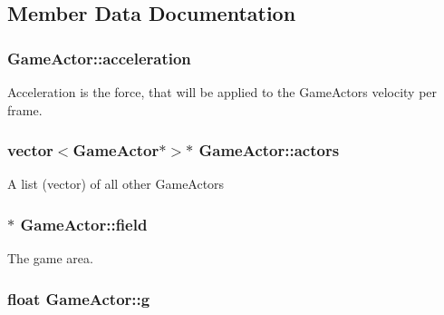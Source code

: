 \subsection{Member Data Documentation}
\hypertarget{class_game_actor_aa62fdbdad09045bcd6f3a150c3a0038b}{
\subsubsection[{acceleration}]{ Game\+Actor\+::acceleration\hspace{0.3cm}{\ttfamily [protected]}}}\label{class_game_actor_aa62fdbdad09045bcd6f3a150c3a0038b}
Acceleration is the force, that will be applied to the Game\+Actors velocity per frame. \hypertarget{class_game_actor_a2405618d895f5143b42ae9e94d20e693}{
\subsubsection[{actors}]{\setlength{\rightskip}{0pt plus 5cm}vector$<${\bf Game\+Actor}$\ast$$>$$\ast$ Game\+Actor\+::actors\hspace{0.3cm}{\ttfamily [protected]}}}\label{class_game_actor_a2405618d895f5143b42ae9e94d20e693}
A list (vector) of all other Game\+Actors \hypertarget{class_game_actor_a0224fbc502abd6b7579787aa234332d5}{
\subsubsection[{field}]{$\ast$ Game\+Actor\+::field\hspace{0.3cm}{\ttfamily [protected]}}}\label{class_game_actor_a0224fbc502abd6b7579787aa234332d5}
The game area. \hypertarget{class_game_actor_a42ed4bef0d99cf053ff9a025c86d34d3}{
\subsubsection[{g}]{\setlength{\rightskip}{0pt plus 5cm}float Game\+Actor\+::g\hspace{0.3cm}{\ttfamily [protected]}}}\label{class_game_actor_a42ed4bef0d99cf053ff9a025c86d34d3}

